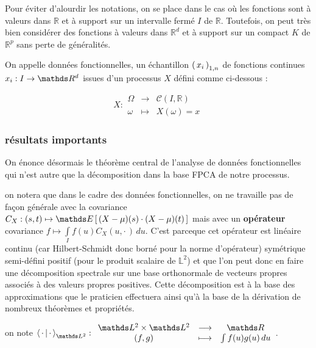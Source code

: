 
Pour éviter d'alourdir les notations, on se place dans le cas où les fonctions sont à valeurs dans $\mathds R$ et à support sur un intervalle fermé $I$ de $\mathds R$. Toutefois, on peut très bien considérer des fonctions à valeurs dans $\mathds R^d$ et à support sur un compact $K$ de $\mathds R^p$ sans perte de généralités.

\begin{definition}

    On appelle données fonctionnelles, un échantillon $\left( \, {x} _ {i} \, \right)_{1, n}$ de fonctions continues $x_i : I \rightarrow \R d$ issues d'un processus $X$ défini comme ci-dessous :

    $$X : 
    \begin{array}{ccc}
        \Omega & \longrightarrow & \mathcal C(I, \mathds R)
        \\
        \omega & \longmapsto & X(\omega) = x 
    \end{array}
    $$

\end{definition}

\subsubsection{résultats importants}

On énonce désormais le théorème central de l'analyse de données fonctionnelles qui n'est autre que la décomposition dans la base FPCA de notre processus.

\begin{rem}
    on notera que dans le cadre des données fonctionnelles, on ne travaille pas de façon générale avec la covariance $C_X : (s,t) \mapsto \esperance{ (X - \mu)(s) \cdot (X - \mu)(t) }$ mais avec un \textbf{opérateur} covariance $f \mapsto \int\limits_I f(u)C_X(u, \cdot \,) \,du$. C'est parceque cet opérateur est linéaire continu (car Hilbert-Schmidt donc borné pour la norme d'opérateur) symétrique semi-défini positif (pour le produit scalaire de $\mathds L^2$) et que l'on peut donc en faire une décomposition spectrale sur une base orthonormale de vecteurs propres associés à des valeurs propres positives. Cette décomposition est à la base des approximations que le praticien effectuera ainsi qu'à la base de la dérivation de nombreux théorèmes et propriétés.
\end{rem}

\bigskip

on note $\prodscalselon \cdot \cdot {\mathds L^2}: \begin{array}{ccc}
    \mathds L^2 \times \mathds L^2 & \longrightarrow & \mathds R
    \\
    (f,g) & \longmapsto & \int f(u)g(u) \, du 
\end{array}$.

